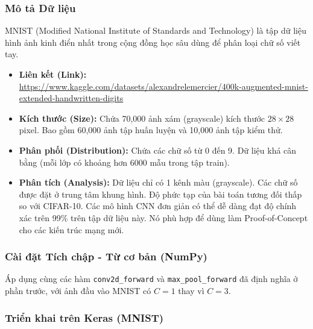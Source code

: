 \documentclass[12pt,a4paper]{article}
\begin{document}
\subsubsection{Mô tả Dữ liệu}
MNIST (Modified National Institute of Standards and Technology) là tập dữ liệu hình ảnh kinh điển nhất trong cộng đồng học sâu dùng để phân loại chữ số viết tay.
\begin{itemize}
    \item \textbf{Liên kết (Link):} \url{https://www.kaggle.com/datasets/alexandrelemercier/400k-augmented-mnist-extended-handwritten-digits}
    \item \textbf{Kích thước (Size):} Chứa 70,000 ảnh xám (grayscale) kích thước $28 \times 28$ pixel. Bao gồm 60,000 ảnh tập huấn luyện và 10,000 ảnh tập kiểm thử.
    \item \textbf{Phân phối (Distribution):} Chứa các chữ số từ 0 đến 9. Dữ liệu khá cân bằng (mỗi lớp có khoảng hơn 6000 mẫu trong tập train).
    \item \textbf{Phân tích (Analysis):} Dữ liệu chỉ có 1 kênh màu (grayscale). Các chữ số được đặt ở trung tâm khung hình. Độ phức tạp của bài toán tương đối thấp so với CIFAR-10. Các mô hình CNN đơn giản có thể dễ dàng đạt độ chính xác trên 99\% trên tập dữ liệu này. Nó phù hợp để dùng làm Proof-of-Concept cho các kiến trúc mạng mới.
\end{itemize}

\subsubsection{Cài đặt Tích chập - Từ cơ bản (NumPy)}
Áp dụng cùng các hàm \texttt{conv2d\_forward} và \texttt{max\_pool\_forward} đã định nghĩa ở phần trước, với ảnh đầu vào MNIST có $C=1$ thay vì $C=3$.

\subsubsection{Triển khai trên Keras (MNIST)}
\end{document}
